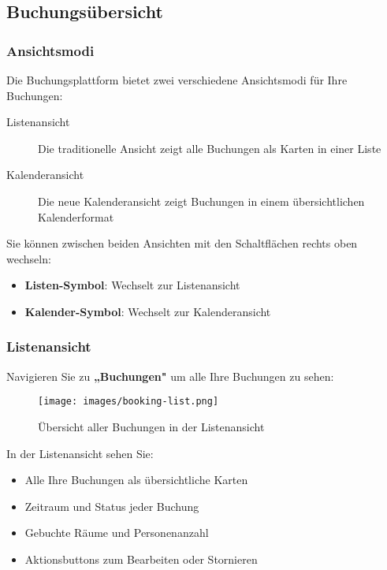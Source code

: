 \subsection{Buchungsübersicht}

\subsubsection{Ansichtsmodi}

Die Buchungsplattform bietet zwei verschiedene Ansichtsmodi für Ihre Buchungen:

\begin{description}
    \item[Listenansicht] Die traditionelle Ansicht zeigt alle Buchungen als Karten in einer Liste
    \item[Kalenderansicht] Die neue Kalenderansicht zeigt Buchungen in einem übersichtlichen Kalenderformat
\end{description}

Sie können zwischen beiden Ansichten mit den Schaltflächen rechts oben wechseln:
\begin{itemize}
    \item \textbf{Listen-Symbol}: Wechselt zur Listenansicht
    \item \textbf{Kalender-Symbol}: Wechselt zur Kalenderansicht
\end{itemize}

\subsubsection{Listenansicht}

Navigieren Sie zu \textbf{„Buchungen"} um alle Ihre Buchungen zu sehen:

\begin{figure}[H]
    \centering
    \texttt{[image: images/booking-list.png]}
    \caption{Übersicht aller Buchungen in der Listenansicht}
    \label{fig:booking-list}
\end{figure}

In der Listenansicht sehen Sie:
\begin{itemize}
    \item Alle Ihre Buchungen als übersichtliche Karten
    \item Zeitraum und Status jeder Buchung
    \item Gebuchte Räume und Personenanzahl
    \item Aktionsbuttons zum Bearbeiten oder Stornieren
\end{itemize}

